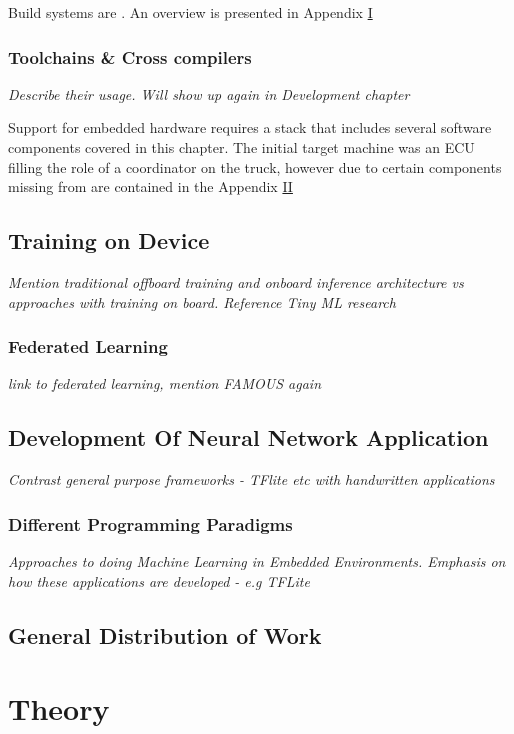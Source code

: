 Build systems are . An overview is presented in Appendix \hyperref[buildsystems]{I}

\subsection[SDKs \& Compiler Toolchains]{Toolchains \& Cross compilers}
\textit{Describe their usage. Will show up again in Development chapter}

Support for embedded hardware requires a stack that includes several software components covered in this chapter. The initial target machine was an ECU filling the role of a coordinator on the truck, however due to certain components missing from are contained in the Appendix \hyperref[rtc-c300]{II}

\section{Training on Device}

\textit{Mention traditional offboard training and onboard inference architecture vs approaches with training on board. Reference Tiny ML research}

\subsection{Federated Learning}

\textit{link to federated learning, mention FAMOUS again}

\section[Development of Neural Network Application]{Development Of Neural Network Application}
\textit{Contrast general purpose frameworks - TFlite etc with handwritten applications}

\subsection{Different Programming Paradigms}
\textit{Approaches to doing Machine Learning in Embedded Environments. Emphasis on how these applications are developed - e.g TFLite}

\section{General Distribution of Work}

\chapter{Theory}

